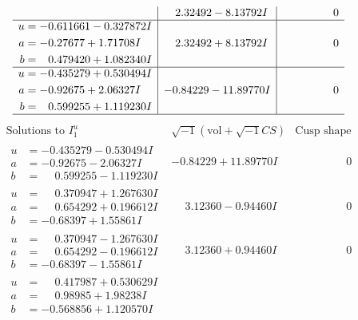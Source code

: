\documentclass[1p]{elsarticle_modified}
\theoremstyle{definition}
\newcommand{\I}{\sqrt{-1}}
\begin{document}
$$\begin{array}{c|c|c}
 & \phantom{-}2.32492 - 8.13792 I & \phantom{-0.000000 } 0 \\ \hline\begin{aligned}
u &= -0.611661 - 0.327872 I \\
a &= -0.27677 + 1.71708 I \\
b &= \phantom{-}0.479420 + 1.082340 I\end{aligned}
 & \phantom{-}2.32492 + 8.13792 I & \phantom{-0.000000 } 0 \\ \hline\begin{aligned}
u &= -0.435279 + 0.530494 I \\
a &= -0.92675 + 2.06327 I \\
b &= \phantom{-}0.599255 + 1.119230 I\end{aligned}
 & -0.84229 - 11.89770 I & \phantom{-0.000000 } 0\\
 \hline 
 \end{array}$$\newpage$$\begin{array}{c|c|c}  
\text{Solutions to }I^u_{1}& \I (\text{vol} + \sqrt{-1}CS) & \text{Cusp shape}\\
 \hline 
\begin{aligned}
u &= -0.435279 - 0.530494 I \\
a &= -0.92675 - 2.06327 I \\
b &= \phantom{-}0.599255 - 1.119230 I\end{aligned}
 & -0.84229 + 11.89770 I & \phantom{-0.000000 } 0 \\ \hline\begin{aligned}
u &= \phantom{-}0.370947 + 1.267630 I \\
a &= \phantom{-}0.654292 + 0.196612 I \\
b &= -0.68397 + 1.55861 I\end{aligned}
 & \phantom{-}3.12360 - 0.94460 I & \phantom{-0.000000 } 0 \\ \hline\begin{aligned}
u &= \phantom{-}0.370947 - 1.267630 I \\
a &= \phantom{-}0.654292 - 0.196612 I \\
b &= -0.68397 - 1.55861 I\end{aligned}
 & \phantom{-}3.12360 + 0.94460 I & \phantom{-0.000000 } 0 \\ \hline\begin{aligned}
u &= \phantom{-}0.417987 + 0.530629 I \\
a &= \phantom{-}0.98985 + 1.98238 I \\
b &= -0.568856 + 1.120570 I\end{aligned}

\end{array}$$
\end{document}
